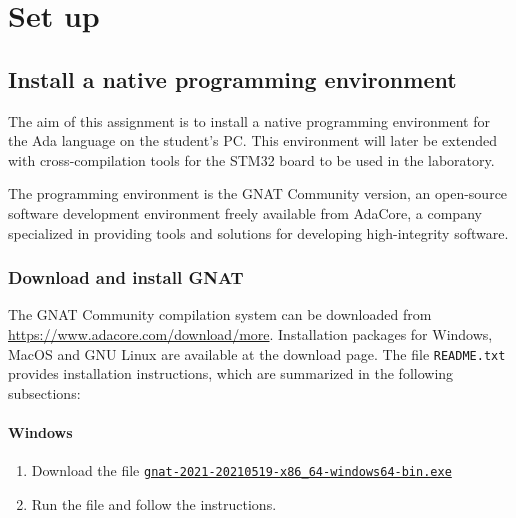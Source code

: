 \chapter{Set up}\label{ch:Setup}


\section{Install a native programming environment}

The aim of this assignment is to
install a native programming environment
for the Ada language on the student's PC.
This environment will later be extended with cross-compilation tools
for the STM32 board to be used in the laboratory.

The programming environment is the GNAT Community version,
an open-source software development environment freely available from AdaCore,
a company specialized in providing tools
and solutions for developing high-integrity software.


\subsection{Download and install GNAT}
The GNAT Community compilation system can be downloaded from \url{https://www.adacore.com/download/more}.
Installation packages for Windows, MacOS and GNU Linux
are available at the download page.
The file \texttt{README.txt} provides installation instructions,
which are summarized in the following subsections:

\subsubsection*{Windows}
\begin{enumerate}
\item Download the file \href{https://community.download.adacore.com/v1/797dbae8bdb8a3f661dad78dd73d8e40218a68d8?filename=gnat-2021-20210519-x86\_64-windows64-bin.exe\&rand=1472}{\texttt{gnat-2021-20210519-x86\_64-windows64-bin.exe}}

\item Run the file and follow the instructions.
\end{enumerate}

